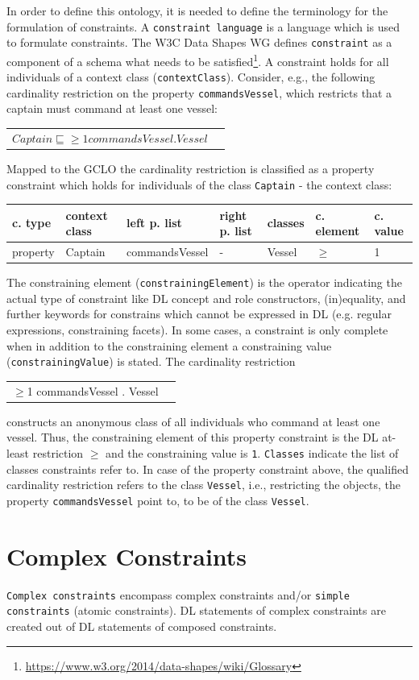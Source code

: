 \documentclass{llncs}
\newcommand{\ms}[1]{\texttt{#1}}
\newenvironment{gcotable}{
  \scriptsize
  \sffamily
  \vspace{0.3cm}
	\begin{center}
  \begin{tabular}{l|l|l|l|l|l|l}
  \hline
  \textbf{c. type} & \textbf{context class} & \textbf{left p. list} & \textbf{right p. list} & \textbf{classes} & \textbf{c. element} & \textbf{c. value} \\
  \hline

}{
  \hline
  \end{tabular}
	\end{center}
}
\newenvironment{DL}{
	\begin{center}
  \begin{tabular}{r l}

}{
  \end{tabular}
	\end{center}
}
\begin{document}
In order to define this ontology, it is needed to define the terminology for the formulation of constraints. 
A \ms{constraint language} is a language which is used to formulate constraints.
The W3C Data Shapes WG defines \ms{constraint} as a component of a schema what needs to be satisfied\footnote{\url{https://www.w3.org/2014/data-shapes/wiki/Glossary}}.
A constraint holds for all individuals of a context class (\ms{contextClass}).
Consider, e.g., the following cardinality restriction on the property \ms{commandsVessel}, which restricts that a captain must command at least one vessel: 
\begin{DL}
$Captain \sqsubseteq \geq1 commandsVessel . Vessel $
\end{DL}
Mapped to the GCLO the cardinality restriction is classified as a property constraint which holds for individuals of the class \ms{Captain} - the context class:
\begin{gcotable}
property & Captain & commandsVessel & - & Vessel & $\geq$ & 1 \\
\end{gcotable}
The constraining element (\ms{constrainingElement}) is the operator indicating the actual type of constraint like DL concept and role constructors, (in)equality, and further keywords for constrains which cannot be expressed in DL (e.g. regular expressions, constraining facets).
In some cases, a constraint is only complete when in addition to the constraining element a constraining value (\ms{constrainingValue}) is stated.
The cardinality restriction 
\begin{DL}
$\geq$1 commandsVessel . Vessel
\end{DL}
constructs an anonymous class of all individuals who command at least one vessel.
Thus, the constraining element of this property constraint is the DL at-least restriction \ms{$\geq$} and the constraining value is \ms{1}.
\ms{Classes} indicate the list of classes constraints refer to.
In case of the property constraint above, the qualified cardinality restriction refers to the class \ms{Vessel}, 
i.e., restricting the objects, the property \ms{commandsVessel} point to, to be of the class \ms{Vessel}.

\section{Complex Constraints}

\ms{Complex constraints} encompass complex constraints and/or \ms{simple constraints} (atomic constraints).
DL statements of complex constraints are created out of DL statements of composed constraints. 
\end{document}
